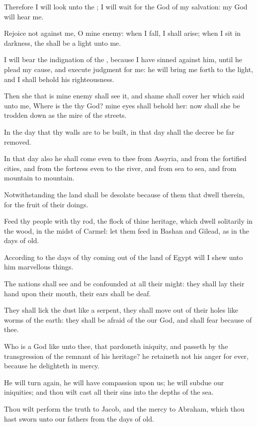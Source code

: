 \verse Therefore I will look unto the \LORD; I will wait for the God of my salvation: my God will hear me.

\verse Rejoice not against me, O mine enemy: when I fall, I shall arise; when I sit in darkness, the \LORD shall be a light unto me.

\verse I will bear the indignation of the \LORD, because I have sinned against him, until he plead my cause, and execute judgment for me: he will bring me forth to the light, and I shall behold his righteousness.

\verse Then she that is mine enemy shall see it, and shame shall cover her which said unto me, Where is the \LORD thy God? mine eyes shall behold her: now shall she be trodden down as the mire of the streets.

\verse In the day that thy walls are to be built, in that day shall the decree be far removed.

\verse In that day also he shall come even to thee from Assyria, and from the fortified cities, and from the fortress even to the river, and from sea to sea, and from mountain to mountain.

\verse Notwithstanding the land shall be desolate because of them that dwell therein, for the fruit of their doings.

\verse Feed thy people with thy rod, the flock of thine heritage, which dwell solitarily in the wood, in the midst of Carmel: let them feed in Bashan and Gilead, as in the days of old.

\verse According to the days of thy coming out of the land of Egypt will I shew unto him marvellous things.

\verse The nations shall see and be confounded at all their might: they shall lay their hand upon their mouth, their ears shall be deaf.

\verse They shall lick the dust like a serpent, they shall move out of their holes like worms of the earth: they shall be afraid of the \LORD our God, and shall fear because of thee.

\verse Who is a God like unto thee, that pardoneth iniquity, and passeth by the transgression of the remnant of his heritage? he retaineth not his anger for ever, because he delighteth in mercy.

\verse He will turn again, he will have compassion upon us; he will subdue our iniquities; and thou wilt cast all their sins into the depths of the sea.

\verse Thou wilt perform the truth to Jacob, and the mercy to Abraham, which thou hast sworn unto our fathers from the days of old.

